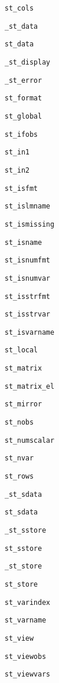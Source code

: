 \documentclass{article}
\begin{document}
\begin{multicols}{3}
\setcounter{finalcolumnbadness}{0}

\lstinline$st_cols$ 

\lstinline$_st_data$ 

\lstinline$st_data$ 

{\color{gray}\lstinline$_st_display$}

{\color{gray}\lstinline$_st_error$}

\lstinline$st_format$ 

\lstinline$st_global$ 

\lstinline$st_ifobs$ 

\lstinline$st_in1$ 

\lstinline$st_in2$ 

\lstinline$st_isfmt$ 

\lstinline$st_islmname$ 

\lstinline$st_ismissing$ 

\lstinline$st_isname$ 

\lstinline$st_isnumfmt$ 

\lstinline$st_isnumvar$ 

\lstinline$st_isstrfmt$ 

\lstinline$st_isstrvar$ 

\lstinline$st_isvarname$ 

\lstinline$st_local$ 

\lstinline$st_matrix$ 

\lstinline$st_matrix_el$

\lstinline$st_mirror$ 

\lstinline$st_nobs$ 

\lstinline$st_numscalar$ 

\lstinline$st_nvar$

\lstinline$st_rows$

\lstinline$_st_sdata$ 

\lstinline$st_sdata$

\lstinline$_st_sstore$

\lstinline$st_sstore$ 

\lstinline$_st_store$ 

\lstinline$st_store$ 

\lstinline$st_varindex$ 

\lstinline$st_varname$ 

\lstinline$st_view$ 

\lstinline$st_viewobs$ 

\lstinline$st_viewvars$
\end{multicols}
\end{document}
